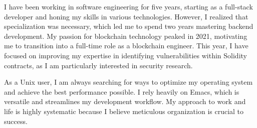 

\begin{cvparagraph}

I have been working in software engineering for five years, starting as a full-stack developer and honing my skills in various technologies. However, I realized that specialization was necessary, which led me to spend two years mastering backend development. My passion for blockchain technology peaked in 2021, motivating me to transition into a full-time role as a blockchain engineer. This year, I have focused on improving my expertise in identifying vulnerabilities within Solidity contracts, as I am particularly interested in security research.

As a Unix user, I am always searching for ways to optimize my operating system and achieve the best performance possible. I rely heavily on Emacs, which is versatile and streamlines my development workflow. My approach to work and life is highly systematic because I believe meticulous organization is crucial to success.\end{cvparagraph}
